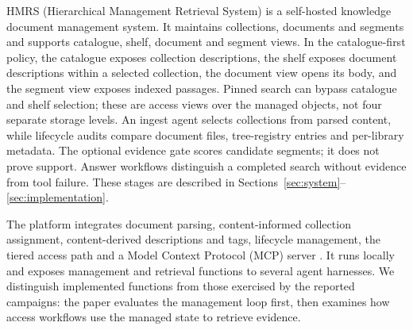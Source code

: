 HMRS (Hierarchical Management Retrieval System) is a self-hosted
knowledge document management system. It maintains collections, documents and
segments and supports catalogue, shelf, document and segment views. In the
catalogue-first policy, the catalogue exposes collection descriptions, the
shelf exposes document descriptions within a selected collection, the document
view opens its body, and the segment view exposes indexed passages. Pinned
search can bypass catalogue and shelf selection; these are access views over
the managed objects, not four separate storage levels. An ingest agent selects
collections from parsed content, while lifecycle audits compare document files,
tree-registry entries and per-library metadata. The optional evidence gate
scores candidate segments; it does not prove support. Answer workflows
distinguish a completed search without evidence from tool failure. These
stages are described in Sections~\ref{sec:system}--\ref{sec:implementation}.

The platform integrates document parsing, content-informed collection assignment,
content-derived descriptions and tags, lifecycle management, the tiered access
path and a Model Context Protocol (MCP) server \cite{mcp}. It runs locally and
exposes management and retrieval functions to several agent harnesses. We
distinguish implemented functions from those exercised by the reported
campaigns: the paper evaluates the management loop first, then examines how
access workflows use the managed state to retrieve evidence.

